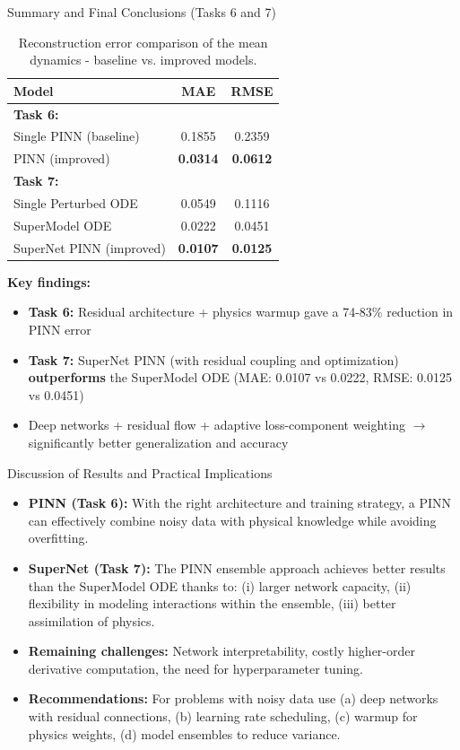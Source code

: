 \documentclass[9pt]{beamer}
\begin{document}
\begin{frame}{Summary and Final Conclusions (Tasks 6 and 7)}
\begin{table}
\centering
\begin{tabular}{l|cc}
\textbf{Model} & \textbf{MAE} & \textbf{RMSE} \\
\hline
\textbf{Task 6:} & & \\
  Single PINN (baseline) & 0.1855 & 0.2359 \\
  PINN (improved) & \textbf{0.0314} & \textbf{0.0612} \\
\hline
\textbf{Task 7:} & & \\
  Single Perturbed ODE & 0.0549 & 0.1116 \\
  SuperModel ODE & 0.0222 & 0.0451 \\
  SuperNet PINN (improved) & \textbf{0.0107} & \textbf{0.0125} \\
\end{tabular}
\caption{Reconstruction error comparison of the mean dynamics - baseline vs. improved models.}
\end{table}

\textbf{Key findings:}
\begin{itemize}
  \item \textbf{Task 6:} Residual architecture + physics warmup gave a 74-83\% reduction in PINN error
  \item \textbf{Task 7:} SuperNet PINN (with residual coupling and optimization) \textbf{outperforms} the SuperModel ODE (MAE: 0.0107 vs 0.0222, RMSE: 0.0125 vs 0.0451)
  \item Deep networks + residual flow + adaptive loss-component weighting $\to$ significantly better generalization and accuracy
\end{itemize}
\end{frame}

\begin{frame}{Discussion of Results and Practical Implications}
\begin{itemize}
  \item \textbf{PINN (Task 6):} With the right architecture and training strategy, a PINN can effectively combine noisy data with physical knowledge while avoiding overfitting.
  \item \textbf{SuperNet (Task 7):} The PINN ensemble approach achieves better results than the SuperModel ODE thanks to: (i) larger network capacity, (ii) flexibility in modeling interactions within the ensemble, (iii) better assimilation of physics.
  \item \textbf{Remaining challenges:} Network interpretability, costly higher-order derivative computation, the need for hyperparameter tuning.
  \item \textbf{Recommendations:} For problems with noisy data use (a) deep networks with residual connections, (b) learning rate scheduling, (c) warmup for physics weights, (d) model ensembles to reduce variance.
\end{itemize}
\end{frame}



\end{document}
